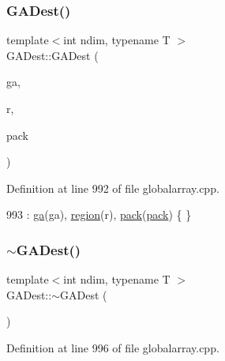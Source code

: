 \subsubsection{\texorpdfstring{G\+A\+Dest()}{GADest()}\hspace{0.1cm}{\footnotesize\ttfamily [1/2]}}
{\footnotesize\ttfamily template$<$int ndim, typename T $>$ \\
G\+A\+Dest\+::\+G\+A\+Dest (\begin{DoxyParamCaption}\item[{\hyperlink{classshark_1_1ndim_1_1_global_array}{Global\+Array}$<$ ndim, T $>$ \&}]{ga,  }\item[{\hyperlink{structshark_1_1ndim_1_1coords__range}{coords\+\_\+range}$<$ ndim $>$}]{r,  }\item[{bool}]{pack }\end{DoxyParamCaption})\hspace{0.3cm}{\ttfamily [private]}}



Definition at line 992 of file globalarray.\+cpp.


\begin{DoxyCode}
993     : \hyperlink{classshark_1_1ndim_1_1_g_a_dest_aa64cb1bd1f2155c6cca997e4ba69760e}{ga}(ga), \hyperlink{classshark_1_1ndim_1_1_g_a_dest_a13e2c3f9bc86ceec20bd4c98bf4699b2}{region}(r), \hyperlink{classshark_1_1ndim_1_1_g_a_dest_aeef6b8ca8d9d57db09b32949e0493aca}{pack}(\hyperlink{classshark_1_1ndim_1_1_g_a_dest_aeef6b8ca8d9d57db09b32949e0493aca}{pack}) \{ \}
\end{DoxyCode}
\hypertarget{classshark_1_1ndim_1_1_g_a_dest_a65b5bbfe74c714882a0469d62d0dd355}{}\label{classshark_1_1ndim_1_1_g_a_dest_a65b5bbfe74c714882a0469d62d0dd355} 
\subsubsection{\texorpdfstring{$\sim$\+G\+A\+Dest()}{~GADest()}}
{\footnotesize\ttfamily template$<$int ndim, typename T $>$ \\
G\+A\+Dest\+::$\sim$\+G\+A\+Dest (\begin{DoxyParamCaption}{ }\end{DoxyParamCaption})}



Definition at line 996 of file globalarray.\+cpp.


